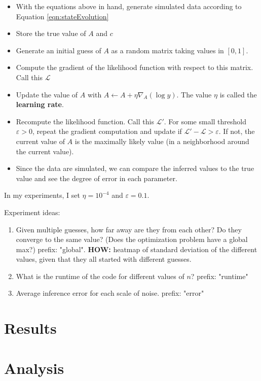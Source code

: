\documentclass{article}
\theoremstyle{definition}
\begin{document}
\begin{itemize}
    \item With the equations above in hand, generate simulated data according to Equation \ref{eqn:stateEvolution}
    \item Store the true value of $A$ and $c$
    \item Generate an initial guess of $A$ as a random matrix taking values in $[0, 1]$.
    \item Compute the gradient of the likelihood function with respect to this matrix. Call this $\mathcal{L}$
    \item Update the value of $A$ with $A \leftarrow A + \eta \nabla_A (\log y)$. The value $\eta$ is called the \textbf{learning rate}.
    \item Recompute the likelihood function. Call this $\mathcal{L}'$. For some small threshold $\varepsilon > 0$, repeat the gradient computation and update if $\mathcal{L}' - \mathcal{L} > \varepsilon$. If not, the current value of $A$ is the maximally likely value (in a neighborhood around the current value). 
    \item Since the data are simulated, we can compare the inferred values to the true value and see the degree of error in each parameter. 
\end{itemize}

In my experiments, I set $\eta = 10^{-4}$ and $\varepsilon = 0.1$.

Experiment ideas:

\begin{enumerate}
    \item Given multiple guesses, how far away are they from each other? Do they converge to the same value? (Does the optimization problem have a global max?) prefix: "global". \textbf{HOW:} heatmap of standard deviation of the different values, given that they all started with different guesses.
    \item What is the runtime of the code for different values of $n$? prefix: "runtime"
    \item Average inference error for each scale of noise. prefix: "error"
\end{enumerate}

\section{Results}

\section{Analysis}
\end{document}
